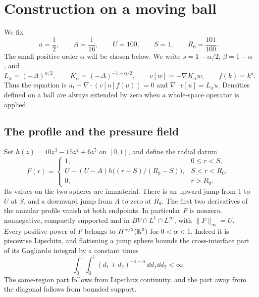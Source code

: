 \section{Construction on a moving ball}\label{sec:construction}

We fix
\[
 a=\frac12,\qquad A=\frac1{16},\qquad U=100,\qquad
 S=1,\qquad R_0=\frac{101}{100}.
\]
The small positive order $\alpha$ will be chosen below. We write
$s=1-\alpha/2$, $\beta=1-\alpha$, and
\[
 L_\alpha=(-\Delta)^{\alpha/2},\qquad
 K_\alpha=(-\Delta)^{-1+\alpha/2},\qquad
 v[w]=-\nabla K_\alpha w,\qquad f(k)=k^a.
\]
Thus the equation is $u_t+\nabla\cdot(v[u]f(u))=0$ and
$\nabla\cdot v[u]=L_\alpha u$. Densities defined on a ball are always
extended by zero when a whole-space operator is applied.

\subsection{The profile and the pressure field}

Set $h(z)=10z^3-15z^4+6z^5$ on $[0,1]$, and define the radial datum
\begin{equation}\label{eq:datum}
 F(r)=\begin{cases}
 1,&0\leq r<S,\\
 U-(U-A)h\bigl((r-S)/(R_0-S)\bigr),&S<r<R_0,\\
 0,&r>R_0.
 \end{cases}
\end{equation}
Its values on the two spheres are immaterial. There is an upward jump from
$1$ to $U$ at $S$, and a downward jump from $A$ to zero at $R_0$.
The first two derivatives of the annular profile vanish at both endpoints.
In particular $F$ is nonzero, nonnegative, compactly supported and in
$BV\cap L^1\cap L^\infty$, with $\|F\|_\infty=U$.
Every positive power of $F$ belongs to $H^{\alpha/2}(\mathbb R^3)$ for $0<\alpha<1$.
Indeed it is piecewise Lipschitz, and flattening a jump sphere bounds the
cross-interface part of its Gagliardo integral by a constant times
\[
 \int_0^1\int_0^1(d_1+d_2)^{-1-\alpha}\,\dd d_1\dd d_2<\infty.
\]
The same-region part follows from Lipschitz continuity, and the part away
from the diagonal follows from bounded support.

